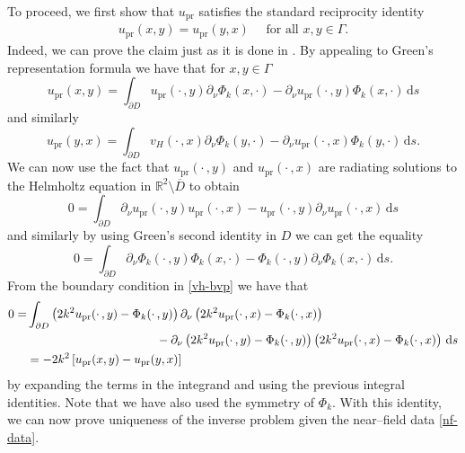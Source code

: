\documentclass{article}
\newcommand{\dnu}{\partial_\nu}
\newcommand{\dd}{\mathrm{d}}
\newcommand{\exD}{\mathbb{R}^2 \setminus \overline{D}}
\numberwithin{equation}{section}
\begin{document}
To proceed, we first show that $u_\textrm{pr}$ satisfies the standard reciprocity identity 
\begin{align}\label{recip}
u_\textrm{pr}(x,y) =  u_\textrm{pr}(y,x) \quad \text{ for all $x,y \in \Gamma$}. 
\end{align}
Indeed, we can prove the claim just as it is done in \cite{QinColton}. By appealing to Green's representation formula we have that for $x,y \in \Gamma$
$$u_\textrm{pr}(x,y)= \int_{\partial D} u_\textrm{pr} ( \cdot \, , y ) \dnu  \Phi_k( x , \cdot)  - \dnu u_\textrm{pr} ( \cdot \, , y ) \Phi_k( x , \cdot) \, \dd s$$
and similarly 
$$u_\textrm{pr}(y,x)= \int_{\partial D}  v_H ( \cdot \, , x ) \dnu  \Phi_k( y , \cdot)  -  \dnu u_\textrm{pr} ( \cdot \, , x ) \Phi_k( y , \cdot) \, \dd s.$$
We can now use the fact that $u_\textrm{pr} ( \cdot \, , y )$ and $u_\textrm{pr} ( \cdot \, , x )$ are radiating solutions to the Helmholtz equation in $\exD$ to obtain 
$$0= \int_{\partial D} \dnu u_\textrm{pr} ( \cdot \, , y ) u_\textrm{pr}( \cdot \, , x) - u_\textrm{pr} ( \cdot \, , y ) \dnu  u_\textrm{pr}( \cdot \, , x) \, \dd s$$
and similarly by using Green's second identity in $D$ we can get the equality 
$$0= \int_{\partial D} \dnu \Phi_k ( \cdot \, , y ) \Phi_k ( x , \cdot) - \Phi_k ( \cdot \, , y ) \dnu  \Phi_k ( x , \cdot)  \, \dd s.$$
From the boundary condition in \eqref{vh-bvp} we have that  
\begin{align*}
0=& \int_{\partial D} \left(2k^2 u_\textrm{pr} ( \cdot \, , y ) - \Phi_k ( \cdot \, , y )  \right) \dnu \left(2k^2 u_\textrm{pr} ( \cdot \, , x ) - \Phi_k ( \cdot \, , x )  \right) \\
&\hspace{1.5in}   -  \dnu \left(2k^2 u_\textrm{pr} ( \cdot \, , y ) - \Phi_k ( \cdot \, , y )  \right) \left(2k^2 u_\textrm{pr} ( \cdot \, , x ) - \Phi_k ( \cdot \, , x )  \right) \, \dd s \\
& =- 2k^2 \left[u_\textrm{pr} ( x , y ) - u_\textrm{pr} ( y,x )  \right]
\end{align*}
by expanding the terms in the integrand and using the previous integral identities. Note that we have also used the symmetry of $\Phi_k$. With this identity, we can now prove uniqueness of the inverse problem given the near--field data \eqref{nf-data}.
\end{document}
